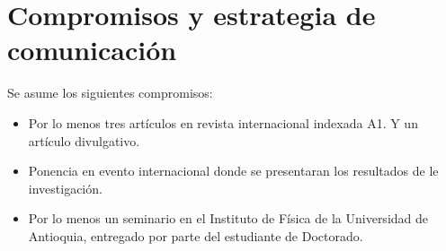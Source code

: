 \section{ Compromisos y estrategia de comunicación }


Se asume los siguientes compromisos:

\begin{itemize}

\item Por lo menos tres artículos en revista internacional indexada
  A1. Y un artículo divulgativo.

\item Ponencia en evento internacional donde se presentaran los resultados de le
  investigación.

\item
Por lo menos un seminario en el Instituto de Física de la Universidad
de Antioquia, entregado por parte del estudiante de Doctorado.

\end{itemize}



